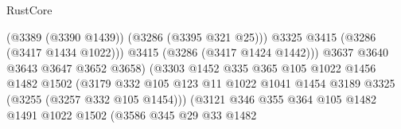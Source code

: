 \begin{lexlean}{RustCore}
\begin{coremodule}
                                                    (@3389 (@3390 @1439))
                                                    (@3286 (@3395 @321 @25)))
                                                  @3325
                                                  @3415
                                                  (@3286 (@3417 @1434 @1022)))
                                                @3415
                                                (@3286 (@3417 @1424 @1442)))
                                              @3637
                                              @3640
                                              @3643
                                              @3647
                                              @3652
                                              @3658)
                                            (@3303
                                              @1452
                                              @335
                                              @365
                                              @105
                                              @1022
                                              @1456
                                              @1482
                                              @1502
                                              (@3179
                                                @332
                                                @105
                                                @123
                                                @11
                                                @1022
                                                @1041
                                                @1454
                                                @3189
                                                @3325
                                                (@3255 (@3257 @332 @105 @1454)))
                                              (@3121
                                                @346
                                                @355
                                                @364
                                                @105
                                                @1482
                                                @1491
                                                @1022
                                                @1502
                                                (@3586
                                                  @345
                                                  @29
                                                  @33
                                                  @1482

\end{coremodule}
\end{lexlean}
